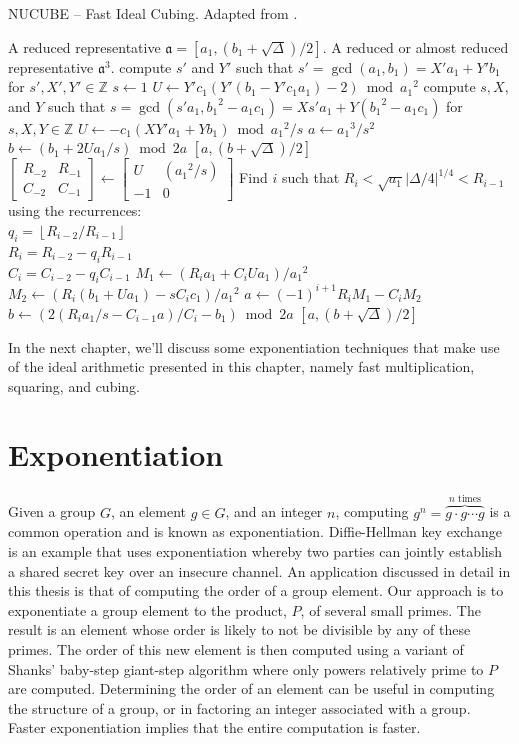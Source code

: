 \documentclass{ucalgthes1}
\theoremstyle{definition}
\newcommand{\ZZ}{\mathbb{Z}}
\newcommand{\matrixtt}[4]{\left[ \begin{array}{rr} #1 & #2 \\ #3 & #4 \end{array} \right]}
\newcommand{\floor}[1]{\left\lfloor #1 \right\rfloor}
\begin{document}
\begin{algorithm}[h]
\caption{NUCUBE -- Fast Ideal Cubing. Adapted from \cite[p.26]{Imbert2010}.}
\label{alg:nucube}
\begin{algorithmic}[1]
\REQUIRE A reduced representative $\mathfrak a = [a_1, (b_1+\sqrt\Delta)/2]$.
\ENSURE A reduced or almost reduced representative $\mathfrak a^3$.
\STATE compute $s'$ and $Y'$ such that $s' = \gcd(a_1, b_1) = X'a_1 + Y'b_1$ for $s', X', Y' \in \ZZ$
	\STATE $s \gets 1$
	\STATE $U \gets Y'c_1(Y'(b_1 - Y'c_1a_1) - 2) \bmod {a_1}^2$
\ELSE
	\STATE compute $s, X$, and $Y$ such that $s = \gcd(s'a_1, {b_1}^2 - a_1c_1) = Xs'a_1 + Y({b_1}^2 - a_1c_1)$ for $s, X, Y \in \ZZ$
	\STATE $U \gets -c_1(XY'a_1+Yb_1) \bmod {a_1}^2/s$
\ENDIF
{}
	\STATE $a \gets {a_1}^3/s^2$
	\STATE $b \gets (b_1 + 2Ua_1/s) \bmod 2a$
	\RETURN $[a, (b+\sqrt\Delta)/2]$
\ENDIF
\STATE $\matrixtt{R_{-2}}{R_{-1}}{C_{-2}}{C_{-1}} \gets \matrixtt{U}{({a_1}^2/s)}{-1}{0}$
\STATE Find $i$ such that $R_i < \sqrt{a_1} |\Delta/4|^{1/4} < R_{i-1}$ using the recurrences: \\
       $q_i = \floor{R_{i-2}/R_{i-1}}$ \\
       $R_i = R_{i-2}-q_i R_{i-1}$ \\
       $C_i=C_{i-2}-q_i C_{i-1}$
\STATE $M_1 \gets (R_ia_1 + C_iUa_1) / {a_1}^2$
\STATE $M_2 \gets (R_i(b_1 + Ua_1) - sC_ic_1) / {a_1}^2$
\STATE $a \gets (-1)^{i+1} R_i M_1 - C_i M_2$
\STATE $b \gets (2(R_ia_1/s - C_{i-1}a)/C_i - b_1) \bmod 2a$
\RETURN $[a, (b+\sqrt\Delta)/2]$
\end{algorithmic}
\end{algorithm}

In the next chapter, we'll discuss some exponentiation techniques that make use of the ideal arithmetic presented in this chapter, namely fast multiplication, squaring, and cubing.


\chapter{Exponentiation}
\label{chap:exponentiation}

Given a group $G$, an element $g \in G$, and an integer $n$, computing $g^n = \overbrace{g \cdot g \cdots g}^{n \textrm{ times}}$ is a common operation and is known as exponentiation.  Diffie-Hellman key exchange is an example that uses exponentiation whereby two parties can jointly establish a shared secret key over an insecure channel.  An application discussed in detail in this thesis is that of computing the order of a group element.  Our approach is to exponentiate a group element to the product, $P$, of several small primes.  The result is an element whose order is likely to not be divisible by any of these primes. The order of this new element is then computed using a variant of Shanks' baby-step giant-step algorithm where only powers relatively prime to $P$ are computed.  Determining the order of an element can be useful in computing the structure of a group, or in factoring an integer associated with a group.  Faster exponentiation implies that the entire computation is faster.
\end{document}
